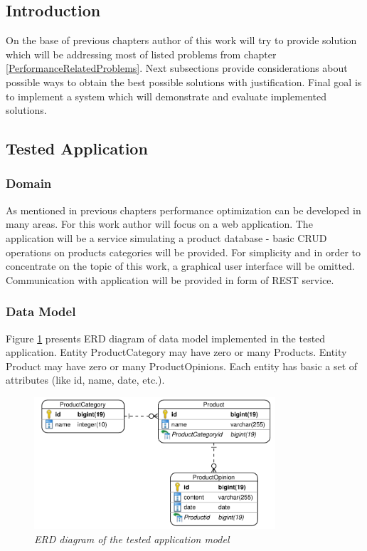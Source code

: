 \documentclass[12pt,a4paper]{article}
\begin{document}
\subsection{Introduction}
On the base of previous chapters author of this work will try to provide solution which will be addressing most of listed problems from chapter \ref{PerformanceRelatedProblems}. Next subsections provide considerations about possible ways to obtain the best possible solutions with justification. Final goal is to implement a system which will demonstrate and evaluate implemented solutions. 

\subsection{Tested Application}   \label{testedApplicaiotn}
\subsubsection{Domain} 
As mentioned in previous chapters performance optimization can be developed in many areas. For this work author will focus on a web application. The application will be a service simulating a product database - basic CRUD operations on products categories will be provided. For simplicity and in order to concentrate on the topic of this work, a graphical user interface will be omitted. Communication with application will be provided in form of REST service.

\subsubsection{Data Model} 
Figure \ref{erd} presents ERD diagram of data model implemented in the tested application. Entity ProductCategory may have zero or many Products. Entity Product may have zero or many ProductOpinions. Each entity has basic a set of attributes (like id, name, date, etc.).  

\begin{figure}[h]
\centering
\includegraphics[width=0.8\textwidth]{ERD}
\caption{\textit{ERD diagram of the tested application model}}
\label{erd}
\end{figure}
\end{document}
